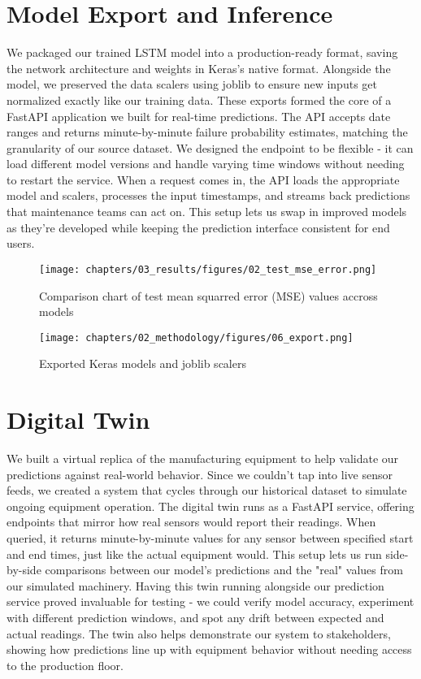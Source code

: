 \section{Model Export and Inference}
We packaged our trained LSTM model into a production-ready format, saving the network architecture and weights in Keras's native format. Alongside the model, we preserved the data scalers using joblib to ensure new inputs get normalized exactly like our training data. These exports formed the core of a FastAPI application we built for real-time predictions. The API accepts date ranges and returns minute-by-minute failure probability estimates, matching the granularity of our source dataset. We designed the endpoint to be flexible - it can load different model versions and handle varying time windows without needing to restart the service. When a request comes in, the API loads the appropriate model and scalers, processes the input timestamps, and streams back predictions that maintenance teams can act on. This setup lets us swap in improved models as they're developed while keeping the prediction interface consistent for end users.

\begin{figure}[H]
    \centering
    \texttt{[image: chapters/03\_results/figures/02\_test\_mse\_error.png]}
    \caption{Comparison chart of test mean squarred error (MSE) values accross models}
    \label{fig:test-mse-error}
\end{figure}

\begin{figure}[H]
    \centering
    \texttt{[image: chapters/02\_methodology/figures/06\_export.png]}
    \caption{Exported Keras models and joblib scalers}
\end{figure}

\section{Digital Twin}
We built a virtual replica of the manufacturing equipment to help validate our predictions against real-world behavior. Since we couldn't tap into live sensor feeds, we created a system that cycles through our historical dataset to simulate ongoing equipment operation. The digital twin runs as a FastAPI service, offering endpoints that mirror how real sensors would report their readings. When queried, it returns minute-by-minute values for any sensor between specified start and end times, just like the actual equipment would. This setup lets us run side-by-side comparisons between our model's predictions and the "real" values from our simulated machinery. Having this twin running alongside our prediction service proved invaluable for testing - we could verify model accuracy, experiment with different prediction windows, and spot any drift between expected and actual readings. The twin also helps demonstrate our system to stakeholders, showing how predictions line up with equipment behavior without needing access to the production floor.

